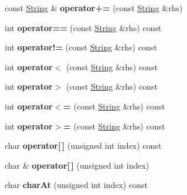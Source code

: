 \begin{DoxyCompactItemize}
\item 
const \hyperlink{class_string}{String} \& {\bfseries operator+=} (const \hyperlink{class_string}{String} \&rhs)\hypertarget{class_string_a942664cd417e945729bd7e84b7ee5551}{}\label{class_string_a942664cd417e945729bd7e84b7ee5551}

\item 
int {\bfseries operator==} (const \hyperlink{class_string}{String} \&rhs) const \hypertarget{class_string_a1f2e5754b50d71ff8214b4e3a2eb5af2}{}\label{class_string_a1f2e5754b50d71ff8214b4e3a2eb5af2}

\item 
int {\bfseries operator!=} (const \hyperlink{class_string}{String} \&rhs) const \hypertarget{class_string_a36db6357dafed08267484852ddaafc69}{}\label{class_string_a36db6357dafed08267484852ddaafc69}

\item 
int {\bfseries operator$<$} (const \hyperlink{class_string}{String} \&rhs) const \hypertarget{class_string_a47b8b84dc27e295c05b8b1f93a6605b2}{}\label{class_string_a47b8b84dc27e295c05b8b1f93a6605b2}

\item 
int {\bfseries operator$>$} (const \hyperlink{class_string}{String} \&rhs) const \hypertarget{class_string_a239f2d617dcfa752a1cc83b2615cc7b7}{}\label{class_string_a239f2d617dcfa752a1cc83b2615cc7b7}

\item 
int {\bfseries operator$<$=} (const \hyperlink{class_string}{String} \&rhs) const \hypertarget{class_string_a0cac0e8a22a9e97d6a11e0b17f83e802}{}\label{class_string_a0cac0e8a22a9e97d6a11e0b17f83e802}

\item 
int {\bfseries operator$>$=} (const \hyperlink{class_string}{String} \&rhs) const \hypertarget{class_string_aeca39c0d1c675a9ccf831814fecdeba7}{}\label{class_string_aeca39c0d1c675a9ccf831814fecdeba7}

\item 
char {\bfseries operator\mbox{[}$\,$\mbox{]}} (unsigned int index) const \hypertarget{class_string_a1fcf18cc37ee5df15e78e1b0eba1e9da}{}\label{class_string_a1fcf18cc37ee5df15e78e1b0eba1e9da}

\item 
char \& {\bfseries operator\mbox{[}$\,$\mbox{]}} (unsigned int index)\hypertarget{class_string_a92a0681d0031d7e99c12c245cc22367e}{}\label{class_string_a92a0681d0031d7e99c12c245cc22367e}

\item 
char {\bfseries char\+At} (unsigned int index) const \hypertarget{class_string_acead06863849178bb7feb0dae0c5d595}{}\label{class_string_acead06863849178bb7feb0dae0c5d595}


\end{DoxyCompactItemize}
